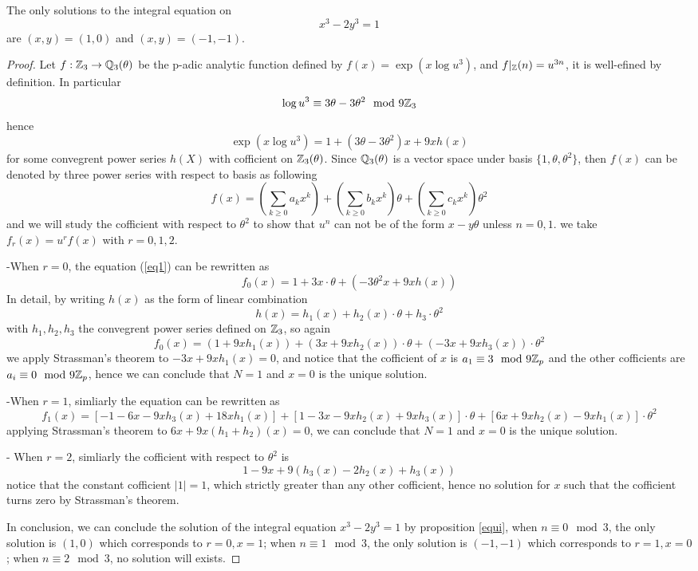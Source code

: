     \begin{theorem} \label{x3-2y3=1}
        The only solutions to the integral equation on
\[
x^{3}-2y^{3}=1
\]
are\/ $(x,y)=(1,0)$ and\/ $(x,y)=(-1,-1)$.

    \begin{proof}
         Let \(f: \mathbb{Z}_3 \to \mathbb{Q}_3(\theta)\) be the p-adic analytic function defined by \(f(x) = \exp({x\log{u^3}})\), and \(f|_{\mathbb{Z}}(n) = u^{3n}\), it is well-efined by definition. In particular
         \[\log{u^3} \equiv  3\theta-3\theta^2 \mod{9 \mathbb{Z}_3}\]
         hence 
         \begin{equation} \label{eq1}
            \exp(x \log u^3) = 1 + (3\theta-3\theta^2)x+9xh(x)
         \end{equation}
         for some convegrent power series \(h(X)\) with cofficient on \(\mathbb{Z}_3(\theta)\). Since \(\mathbb{Q}_3(\theta)\) is a vector space under basis \(\{1, \theta, \theta^2\}\), then \(f(x)\) can be denoted by three power series with respect to basis as following
         \[f(x) = (\sum_{k \geq 0}a_kx^k)+(\sum_{k \geq 0}b_kx^k)\theta + (\sum_{k \geq 0}c_kx^k)\theta^2\]
         and we will study the cofficient with respect to \(\theta^2\) to show that \(u^n\) can not be of the form \(x-y \theta\) unless \(n=0,1\). we take \(f_r(x) = u^{r}f(x)\) with \(r=0,1,2\).

         -When \(r=0\), the equation (\ref{eq1}) can be rewritten as
         \[f_0(x) = 1+ 3x\cdot \theta + (-3\theta^2x+9xh(x))\]
         In detail, by writing \(h(x)\) as the form of linear combination
         \[h(x) = h_1(x)+h_2(x)\cdot\theta + h_3 \cdot \theta^2\]
         with \(h_1,h_2,h_3\) the convegrent power series defined on \(\mathbb{Z}_3\), so again
         \[f_0(x) = (1+9xh_1(x)) + (3x+9xh_2(x))\cdot \theta + (-3x+9xh_3(x)) \cdot \theta^2\]
         we apply Strassman's theorem to \(-3x+9xh_1(x) = 0\), and notice that the cofficient of \(x\) is \(a_1 \equiv 3 \mod 9\mathbb{Z}_p\) and the other cofficients are \(a_i \equiv 0 \mod 9\mathbb{Z}_p \), hence we can conclude that \(N=1\) and \(x=0\) is the unique solution.
         
         -When \(r=1\), simliarly the equation can be rewritten as
         \[f_1(x) = [-1-6x-9xh_3(x)+18xh_1(x)]+[1-3x-9xh_2(x)+9xh_3(x)]\cdot \theta + [6x+9xh_2(x)-9xh_1(x)]\cdot \theta^2\]
         applying Strassman's theorem to \(6x+9x(h_1+h_2)(x) = 0\), we can conclude that \(N=1\) and \(x=0\) is the unique solution.

         - When \(r=2\), simliarly the cofficient with respect to \(\theta^2\) is \[1-9x+9(h_3(x)-2h_2(x)+h_3(x)) \]
         notice that the constant cofficient \(|1| = 1\), which strictly greater than any other cofficient, hence no solution for \(x\) such that the cofficient turns zero by Strassman's theorem.

         In conclusion, we can conclude the solution of the integral equation \(x^3-2y^3=1\) by proposition \ref{equi}, when \(n \equiv 0 \mod 3\),  the only solution is \((1,0)\) which corresponds to \(r=0, x=1\); when \(n \equiv 1 \mod 3\), the only solution is \((-1,-1)\) which corresponds to \(r=1,x=0\); when \(n \equiv 2 \mod 3\), no solution will exists.
    \end{proof}
    \end{theorem}


